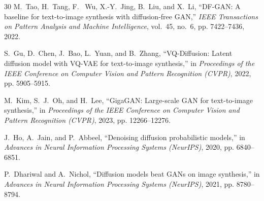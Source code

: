 \documentclass[conference]{IEEEtran}
\begin{document}
\begin{thebibliography}{30}
M.~Tao, H.~Tang, F.~ Wu, X.-Y.~Jing, B.~Liu, and X.~Li, ``DF-GAN: A baseline for text-to-image synthesis with diffusion-free GAN,'' \textit{IEEE Transactions on Pattern Analysis and Machine Intelligence}, vol.~45, no.~6, pp. 7422--7436, 2022.

S.~Gu, D.~Chen, J.~Bao, L.~Yuan, and B.~Zhang, ``VQ-Diffusion: Latent diffusion model with VQ-VAE for text-to-image synthesis,'' in \textit{Proceedings of the IEEE Conference on Computer Vision and Pattern Recognition (CVPR)}, 2022, pp. 5905--5915.

M.~Kim, S.~J.~Oh, and H.~Lee, ``GigaGAN: Large-scale GAN for text-to-image synthesis,'' in \textit{Proceedings of the IEEE Conference on Computer Vision and Pattern Recognition (CVPR)}, 2023, pp. 12266--12276.

J.~Ho, A.~Jain, and P.~Abbeel, ``Denoising diffusion probabilistic models,'' in \textit{Advances in Neural Information Processing Systems (NeurIPS)}, 2020, pp. 6840--6851.

P.~Dhariwal and A.~Nichol, ``Diffusion models beat GANs on image synthesis,'' in \textit{Advances in Neural Information Processing Systems (NeurIPS)}, 2021, pp. 8780--8794.

\end{thebibliography}
\end{document}
